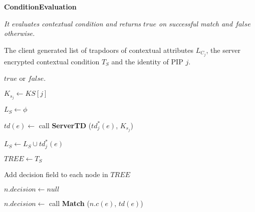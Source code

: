 \documentclass[epsfig,a4paper,11pt,titlepage]{book}
\numberwithin{algorithm}{chapter}
\newcommand{\algofontsize}{\fontsize{11}{12}\selectfont}
\begin{document}
\begin{algorithm} [htp]
{\algofontsize
\caption{\textbf{ConditionEvaluation}}

\label{algo:erbac-match-contextual-condition}

\begin{algorithmic}[1]

\INPUT \emph{It evaluates contextual condition and returns $\mathit{true}$ on successful match and $\mathit{false}$ otherwise.}

\Require The client generated list of trapdoors of contextual attributes $L_{C_j}$, the server encrypted contextual condition $T_{S}$ and the identity of \gls{PIP} $j$.

\Ensure $\mathit{true}$ or $\mathit{false}$.

\medskip

\State $K_{s_j} \leftarrow KS[j]$ {\algofontsize {}} \label{line:erbac-cc-match-ks}

\State $L_{S} \leftarrow \phi$ \label{line:erbac-cc-match-init-list}

 \label{line:erbac-cc-match-loop-s-td}
	
	\State $td(e) \leftarrow$ call \textbf{ServerTD} ($td^*_j (e)$, $K_{s_j}$) \label{line:erbac-cc-match-call-s-td}
	
	\State $L_{S} \leftarrow L_{S} \cup td^*_j (e)$ \label{line:erbac-cc-match-update-list}
	
\EndFor

\State $\mathit{TREE} \leftarrow T_{S}$ \label{line:erbac-cc-match-copy-tree}

\State Add decision field to each node in $\mathit{TREE}$ \label{line:erbac-cc-match-add-field}

 \label{line:erbac-cc-match-loop-tree-init}

	\State $n.decision \leftarrow null$ \label{line:erbac-cc-match-init-field}

\EndFor

 \label{line:erbac-cc-match-loop-tree-match}
	
	 \label{line:erbac-cc-match-loop-list-match}
	
		\State $n.decision \leftarrow$ call \textbf{Match} ($n.c(e)$, $td(e)$) \label{line:erbac-cc-match-decision}


\end{algorithmic}}
\end{algorithm}
\end{document}
